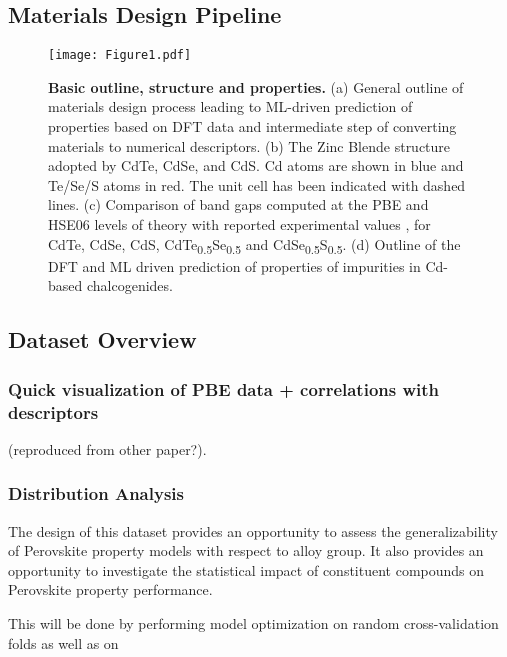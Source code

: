 \documentclass[aip, jmp, amsmath, amssymb]{revtex4-2}
\begin{document}
\subsection*{Materials Design Pipeline}
\label{sec:orged9b7f0}
\begin{figure}[htbp]
\centering
\texttt{[image: Figure1.pdf]}
\caption{\label{fig:outline} \textbf{Basic outline, structure and properties.} (a) General outline of materials design process leading to ML-driven prediction of properties based on DFT data and intermediate step of converting materials to numerical descriptors. (b) The Zinc Blende structure adopted by CdTe, CdSe, and CdS. Cd atoms are shown in blue and Te/Se/S atoms in red. The unit cell has been indicated with dashed lines. (c) Comparison of band gaps computed at the PBE and HSE06 levels of theory with reported experimental values \cite{kim-2014-cdses-nanow,swanson-2017-co-sublim}, for CdTe, CdSe, CdS, CdTe\textsubscript{0.5}Se\textsubscript{0.5} and CdSe\textsubscript{0.5}S\textsubscript{0.5}. (d) Outline of the DFT and ML driven prediction of properties of impurities in Cd-based chalcogenides.}
\end{figure}
\subsection*{Dataset Overview}
\label{sec:org11fefaa}
\subsubsection*{Quick visualization of PBE data + correlations with descriptors}
\label{sec:org002f6ff}
(reproduced from other paper?).\\
\subsubsection*{Distribution Analysis}
\label{sec:orgf398b24}
The design of this dataset provides an opportunity to assess the
generalizability of Perovskite property models with respect to alloy
group. It also provides an opportunity to investigate the statistical
impact of constituent compounds on Perovskite property performance.

This will be done by performing model optimization on random
cross-validation folds as well as on 
\end{document}
